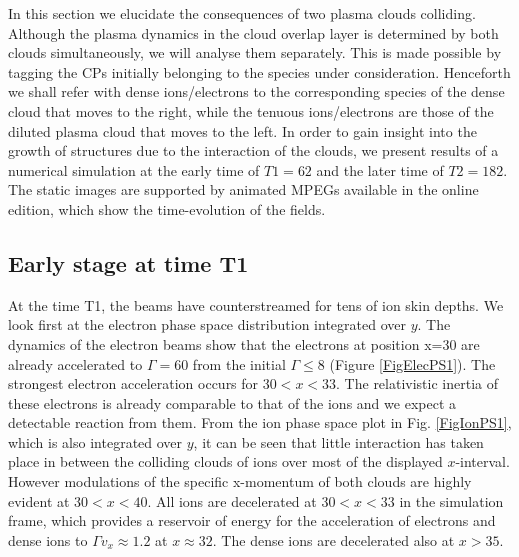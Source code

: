 \documentclass[structabstract]{aa}
\begin{document}
In this section we elucidate the consequences of two plasma clouds colliding. Although the 
plasma dynamics in the cloud overlap layer is determined by both clouds simultaneously,
we will analyse them separately. This is made possible by tagging the CPs initially belonging
to the species under consideration. Henceforth we shall refer with dense ions/electrons to 
the corresponding species of the dense cloud that moves to the right, while the tenuous 
ions/electrons are those of the diluted plasma cloud that moves to the left. In order to 
gain insight into the growth of structures due to the interaction of the clouds, we present 
results of a numerical simulation at the early time of $T1=62$ and the later time of $T2=182$. 
The static images are supported by animated MPEGs available in the online edition, which show 
the time-evolution of the fields.


\subsection{Early stage at time T1}

At the time T1, the beams have counterstreamed for tens of ion skin depths.
We look first at the electron phase space distribution integrated over $y$. 
The dynamics of the electron beams show that the electrons at position x=30 
are already accelerated to $\Gamma=60$ from the initial $\Gamma \le 8$ 
(Figure \ref{FigElecPS1}). The strongest electron acceleration occurs 
for $30<x<33$. The relativistic inertia of these electrons is already 
comparable to that of the ions and we expect a detectable reaction from them.
From the ion phase space plot in Fig. \ref{FigIonPS1}, which is also integrated 
over $y$, it can be seen that little interaction has taken place in between 
the colliding clouds of ions over most of the displayed $x$-interval. However 
modulations of the specific x-momentum of both clouds are highly evident at 
$30<x<40$. All ions are decelerated at $30<x<33$ in the simulation frame, 
which provides a reservoir of energy for the acceleration of electrons and dense ions to $\Gamma v_x \approx 1.2$ at $x\approx 32$. The dense 
ions are decelerated also at $x>35$. 
\end{document}
